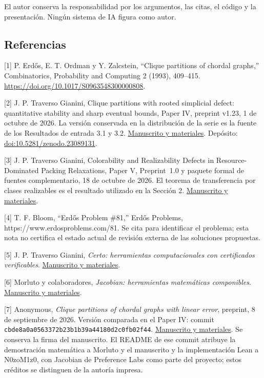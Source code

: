 \documentclass[spanish,11pt,a4paper]{article}
\begin{document}
El autor conserva la responsabilidad por los argumentos, las citas, el
código y la presentación. Ningún sistema de IA figura como autor.

\subsection{Referencias}\small\label{referencias}

{[}1{]} P. Erdős, E. T. Ordman y Y. Zalcstein, ``Clique partitions of
chordal graphs,'' Combinatorics, Probability and Computing 2 (1993),
409--415. \url{https://doi.org/10.1017/S0963548300000808}.

{[}2{]} J. P. Traverso Gianini, Clique partitions with rooted simplicial
defect: quantitative stability and sharp eventual bounds, Paper IV,
preprint v1.23, 1 de octubre de 2026. La versión conservada en la
distribución de la serie es la fuente de los Resultados de entrada 3.1 y
3.2.
\href{https://github.com/jtraverso/erdos-81-chordal-clique-partitions/blob/054593443bdece587dda9686a411bb18b0ca34c5/preprints/PAPER_IV/01_manuscript/PAPER_IV_preprint_v1.23_en.md}{Manuscrito
y materiales}. Depósito:
\href{https://doi.org/10.5281/zenodo.23089131}{doi:10.5281/zenodo.23089131}.

{[}3{]} J. P. Traverso Gianini, Colorability and Realizability Defects
in Resource-Dominated Packing Relaxations, Paper V, \mbox{Preprint 1.0} y
paquete formal de fuentes complementario, 18 de octubre de 2026. El
teorema de transferencia por clases realizables es el resultado
utilizado en la Sección 2.
\href{https://github.com/jtraverso/erdos-81-chordal-clique-partitions/tree/main/preprints/PAPER_V}{Manuscrito
y materiales}.

{[}4{]} T. F. Bloom, ``Erdős Problem \#81,'' Erdős Problems,
https://www.erdosproblems.com/81. Se cita para identificar el problema;
esta nota no certifica el estado actual de revisión externa de las
soluciones propuestas.

{[}5{]} J. P. Traverso Gianini, \emph{Certo: herramientas
computacionales con certificados verificables}.
\href{https://github.com/jtraverso/certo-math}{Manuscrito y materiales}.

{[}6{]} Morluto y colaboradores, \emph{Jacobian: herramientas
matemáticas componibles}.
\href{https://github.com/morluto/jacobian}{Manuscrito y materiales}.

{[}7{]} Anonymous, \emph{Clique partitions of chordal graphs with linear
error}, preprint, 8 de septiembre de 2026. Versión comparada en el Paper
IV: commit \nolinkurl{cbde8a0a0563372b23b1b39a44180d2c0fb02f44}.
\href{https://github.com/N0zoM1z0/erdos-81/blob/cbde8a0a0563372b23b1b39a44180d2c0fb02f44/manuscript/main.pdf}{Manuscrito
y materiales}. Se conserva la firma del manuscrito. El README de ese
commit atribuye la demostración matemática a Morluto y el manuscrito y
la implementación Lean a N0zoM1z0, con Jacobian de Preference Labs como
parte del proyecto; estos créditos se distinguen de la autoría impresa.
\end{document}
